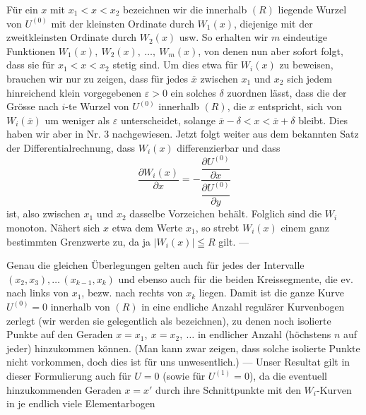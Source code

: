 \par\clearpage{}
\noindent\hspace*{\parindent} Für ein \(x\) mit \(x_1<x<x_2\) bezeichnen wir die innerhalb
\((R)\) liegende Wurzel von \(U^{(0)}\) mit der kleinsten Ordinate durch \(W_1(x)\),
diejenige mit der zweitkleinsten Ordinate durch \(W_2(x)\) usw. So erhalten wir
\(m\) eindeutige Funktionen \(W_1(x),\ W_2(x),\ \ldots,\ W_m(x)\), von denen nun aber
sofort folgt, dass sie für \(x_1<x<x_2\) stetig sind. Um dies etwa für \(W_i(x)\) zu
beweisen, brauchen wir nur zu zeigen, dass für jedes \(\overline{x}\) zwischen \(x_1\) und \(x_2\)
sich jedem hinreichend klein vorgegebenen \(\varepsilon>0\) ein solches \(\delta\) zuordnen lässt,
dass die der Grösse nach \(i\)-te Wurzel von \(U^{(0)}\) innerhalb \((R)\), die \(x\) entspricht,
sich von \(W_i(\overline{x})\) um weniger als \(\varepsilon\) unterscheidet, solange \(\overline{x}-\delta<x<\overline{x}+\delta\)
bleibt. Dies haben wir aber in Nr. 3 nachgewiesen. Jetzt folgt weiter aus
dem bekannten Satz der Differentialrechnung, dass \(W_i(x)\) differenzierbar und
dass
\[
\frac{\partial W_i(x)}{\partial x}=-\frac{\dfrac{\partial U^{(0)}}{\partial x}}{\dfrac{\partial U^{(0)}}{\partial y}}
\]
ist, also zwischen \(x_1\) und \(x_2\) dasselbe Vorzeichen behält. Folglich sind die \(W_i\)
monoton. Nähert sich \(x\) etwa dem Werte \(x_1\), so strebt \(W_i(x)\) einem ganz
bestimmten Grenzwerte zu, da ja \(|W_i(x)|\leqq R\) gilt. —
\par
Genau die gleichen Überlegungen gelten auch für jedes der Intervalle\linebreak
\((x_2,x_3),\ldots\,(x_{k-1},x_k)\) und ebenso auch für die beiden Kreissegmente, die ev.
nach links von \(x_1\), bezw. nach rechts von \(x_k\) liegen. Damit ist die ganze
Kurve \(U^{(0)}=0\) innerhalb von \((R)\) in eine endliche Anzahl regulärer Kurvenbogen
zerlegt (wir werden sie gelegentlich als  bezeichnen),
zu denen noch isolierte Punkte auf den Geraden \(x=x_1,\ x=x_2,\ \ldots\) in endlicher
Anzahl (höchstens \(n\) auf jeder) hinzukommen können. (Man kann zwar
zeigen, dass solche isolierte Punkte nicht vorkommen, doch dies ist für uns
unwesentlich.) — Unser Resultat gilt in dieser Formulierung auch für \(U=0\)
(sowie für \(U^{(1)}=0\)), da die eventuell hinzukommenden Geraden \(x=x'\) durch
ihre Schnittpunkte mit den \(W_i\)-Kurven in je endlich viele Elementarbogen
